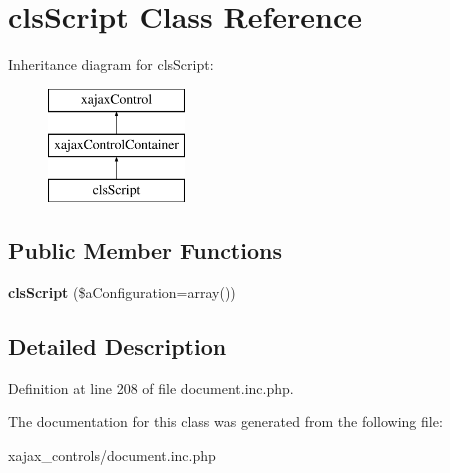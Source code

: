 \hypertarget{classclsScript}{
\section{clsScript Class Reference}
\label{classclsScript}
}
Inheritance diagram for clsScript:\begin{figure}[H]
\begin{center}
\leavevmode
\includegraphics[height=3.000000cm]{classclsScript}
\end{center}
\end{figure}
\subsection*{Public Member Functions}
\begin{DoxyCompactItemize}
\item 
\hypertarget{classclsScript_aa931c3e2cedc66fab55a9da9290f5f8a}{
{\bfseries clsScript} (\$aConfiguration=array())}
\label{classclsScript_aa931c3e2cedc66fab55a9da9290f5f8a}

\end{DoxyCompactItemize}


\subsection{Detailed Description}


Definition at line 208 of file document.inc.php.



The documentation for this class was generated from the following file:\begin{DoxyCompactItemize}
\item 
xajax\_\-controls/document.inc.php\end{DoxyCompactItemize}
